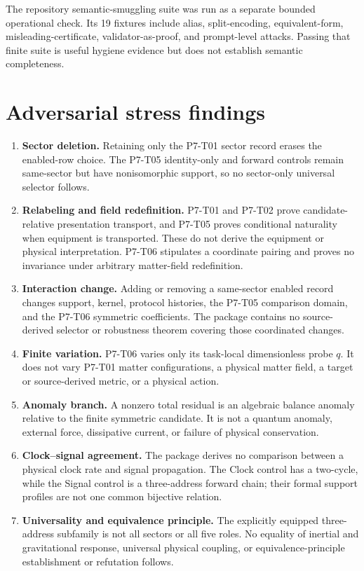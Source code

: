 \documentclass[11pt]{article}
\begin{document}
The repository semantic-smuggling suite was run as a separate bounded
operational check. Its 19 fixtures include alias, split-encoding,
equivalent-form, misleading-certificate, validator-as-proof, and prompt-level
attacks. Passing that finite suite is useful hygiene evidence but does not
establish semantic completeness.

\section{Adversarial stress findings}

\begin{enumerate}[leftmargin=*]
\item \textbf{Sector deletion.} Retaining only the P7-T01 sector record erases
the enabled-row choice. The P7-T05 identity-only and forward controls remain
same-sector but have nonisomorphic support, so no sector-only universal
selector follows.
\item \textbf{Relabeling and field redefinition.} P7-T01 and P7-T02 prove
candidate-relative presentation transport, and P7-T05 proves conditional
naturality when equipment is transported. These do not derive the equipment
or physical interpretation. P7-T06 stipulates a coordinate pairing and proves
no invariance under arbitrary matter-field redefinition.
\item \textbf{Interaction change.} Adding or removing a same-sector enabled
record changes support, kernel, protocol histories, the P7-T05 comparison
domain, and the P7-T06 symmetric coefficients. The package contains no
source-derived selector or robustness theorem covering those coordinated
changes.
\item \textbf{Finite variation.} P7-T06 varies only its task-local
dimensionless probe \(q\). It does not vary P7-T01 matter configurations, a
physical matter field, a target or source-derived metric, or a physical
action.
\item \textbf{Anomaly branch.} A nonzero total residual is an algebraic
balance anomaly relative to the finite symmetric candidate. It is not a
quantum anomaly, external force, dissipative current, or failure of physical
conservation.
\item \textbf{Clock--signal agreement.} The package derives no comparison
between a physical clock rate and signal propagation. The Clock control has a
two-cycle, while the Signal control is a three-address forward chain; their
formal support profiles are not one common bijective relation.
\item \textbf{Universality and equivalence principle.} The explicitly equipped
three-address subfamily is not all sectors or all five roles. No equality of
inertial and gravitational response, universal physical coupling, or
equivalence-principle establishment or refutation follows.
\end{enumerate}
\end{document}
